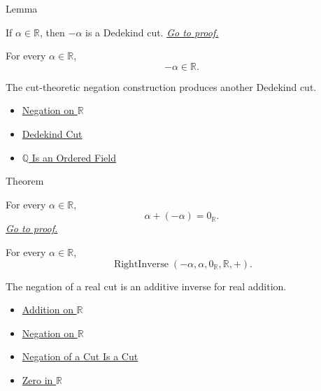 \begin{lemmabox}{Lemma}
\begin{lemma}
\label{lem:negation-of-cut-is-a-cut}
If $\alpha\in\mathbb{R}$, then $-\alpha$ is a Dedekind cut.
\hyperref[prf:negation-of-cut-is-a-cut]{\textit{Go to proof.}}
\end{lemma}
\end{lemmabox}

\begin{remark*}
For every $\alpha\in\mathbb{R}$,
\[
-\alpha\in\mathbb{R}.
\]
\end{remark*}

\begin{remark*}[Interpretation]
The cut-theoretic negation construction produces another Dedekind cut.
\end{remark*}

\begin{dependencies}
\begin{itemize}
  \item \hyperref[def:negation-on-r]{Negation on $\mathbb{R}$}
  \item \hyperref[def:dedekind-cut]{Dedekind Cut}
  \item \hyperref[thm:q-is-an-ordered-field]{$\mathbb{Q}$ Is an Ordered Field}
\end{itemize}
\end{dependencies}

\begin{theorembox}{Theorem}
\begin{theorem}
\label{thm:negation-additive-inverse-on-r}
For every $\alpha\in\mathbb{R}$,
\[
\alpha+(-\alpha)=0_{\mathbb{R}}.
\]
\hyperref[prf:negation-additive-inverse-on-r]{\textit{Go to proof.}}
\end{theorem}
\end{theorembox}

\begin{remark*}
For every $\alpha\in\mathbb{R}$,
\[
\operatorname{RightInverse}(-\alpha,\alpha,0_{\mathbb{R}},\mathbb{R},+).
\]
\end{remark*}

\begin{remark*}[Interpretation]
The negation of a real cut is an additive inverse for real addition.
\end{remark*}

\begin{dependencies}
\begin{itemize}
  \item \hyperref[def:addition-on-r]{Addition on $\mathbb{R}$}
  \item \hyperref[def:negation-on-r]{Negation on $\mathbb{R}$}
  \item \hyperref[lem:negation-of-cut-is-a-cut]{Negation of a Cut Is a Cut}
  \item \hyperref[def:zero-in-r]{Zero in $\mathbb{R}$}
\end{itemize}
\end{dependencies}

